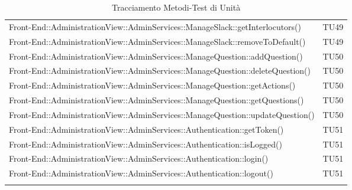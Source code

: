 \documentclass[../PianoDiQualifica.tex]{subfiles}
\begin{document}
\begin{longtable}[c] {>{\centering\arraybackslash}p{9cm} >{\centering\arraybackslash}p{3cm}}
			\addlinespace[0.3em]
			\midrule
			\addlinespace[0.3em] 
			Front-End::AdministrationView::AdminServices::ManageSlack::getInterlocutors()& TU49 \\
			\addlinespace[0.3em]
			\midrule
			\addlinespace[0.3em] 
			Front-End::AdministrationView::AdminServices::ManageSlack::removeToDefault()& TU49 \\
			\addlinespace[0.3em]
			\midrule
			\addlinespace[0.3em]
			Front-End::AdministrationView::AdminServices::ManageQuestion::addQuestion()& TU50 \\ 
			\addlinespace[0.3em]
			\midrule
			\addlinespace[0.3em]
			Front-End::AdministrationView::AdminServices::ManageQuestion::deleteQuestion()& TU50 \\ 
			\addlinespace[0.3em]
			\midrule
			\addlinespace[0.3em]
			Front-End::AdministrationView::AdminServices::ManageQuestion::getActions()& TU50 \\ 
			\addlinespace[0.3em]
			\midrule
			\addlinespace[0.3em]
			Front-End::AdministrationView::AdminServices::ManageQuestion::getQuestions()& TU50 \\
			\addlinespace[0.3em]
			\midrule
			\addlinespace[0.3em] 
			Front-End::AdministrationView::AdminServices::ManageQuestion::updateQuestion()& TU50 \\
			\addlinespace[0.3em]
			\midrule
			\addlinespace[0.3em]
			Front-End::AdministrationView::AdminServices::Authentication::getToken()& TU51 \\ 
			\addlinespace[0.3em]
			\midrule
			\addlinespace[0.3em]
 			Front-End::AdministrationView::AdminServices::Authentication::isLogged()& TU51 \\ 
 			\addlinespace[0.3em]
			\midrule
			\addlinespace[0.3em]
 			Front-End::AdministrationView::AdminServices::Authentication::login()& TU51 \\ 
 			\addlinespace[0.3em]
			\midrule
			\addlinespace[0.3em]
 			Front-End::AdministrationView::AdminServices::Authentication::logout()& TU51 \\ 	
 			\bottomrule
			\caption{Tracciamento Metodi-Test di Unità}
	\end{longtable}
\end{document}
